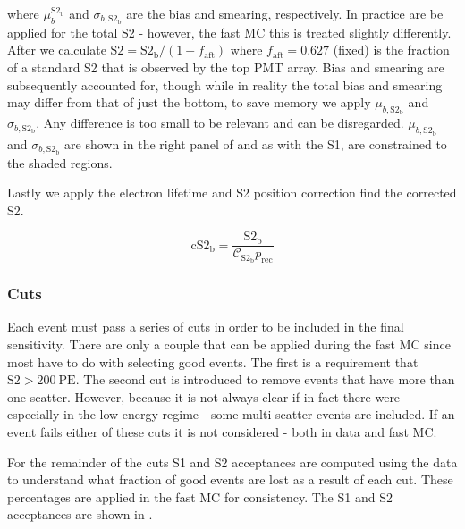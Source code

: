 \noindent where $\mu_{b}^{\mathrm{S2_b}}$ and $\sigma_{b, \mathrm{S2_b}}$ are the \stwob bias and smearing,
respectively.  In practice  are be applied
for the total S2 - however, the fast MC this is treated
slightly differently.  After  we calculate
$\mathrm{S2} = \mathrm{S2_b} / (1 - f_{\mathrm{aft}})$ where $f_{\mathrm{aft}} = 0.627$ (fixed) is the fraction of a standard S2 that
is observed by the top PMT array.  Bias and smearing are subsequently accounted for, though while in reality the total bias and smearing
may differ from that of just the bottom, to save memory we apply $\mu_{b, \mathrm{S2_b}}$ and $\sigma_{b, \mathrm{S2_b}}$.  Any
difference is too small to be relevant and can be disregarded.  $\mu_{b, \mathrm{S2_b}}$ and $\sigma_{b, \mathrm{S2_b}}$ are shown in
the right panel of  and as with the S1, are constrained to the
shaded regions.

Lastly we apply the electron lifetime and S2 position correction find the corrected S2.

\begin{equation}
\mathrm{cS2_b} = \frac{\mathrm{S2_b}}{\mathcal{C}_{\mathrm{S2_b}} p_{\mathrm{rec}}}
\end{equation}



\subsubsection{Cuts}
\label{subsubsec:er_nr_calibrations_parameter_determ_cuts}
Each event must pass a series of cuts in order to be included in the final sensitivity.  There are only a couple that can be applied
during the fast MC since most have to do with selecting good events.  The first is a requirement that
$\mathrm{S2} > 200\ \mathrm{PE}$.  The second cut is introduced to remove events that have more than one scatter.  However, because it is
not always clear if in fact there were - especially in the low-energy regime - some multi-scatter events are included.  If an event
fails either of these cuts it is not considered - both in data and fast MC.

For the remainder of the cuts S1 and S2 acceptances are computed using the data to understand what fraction of good events are lost
as a result of each cut.  These percentages are applied in the fast MC for consistency.  The S1 and S2 acceptances are shown in
.

